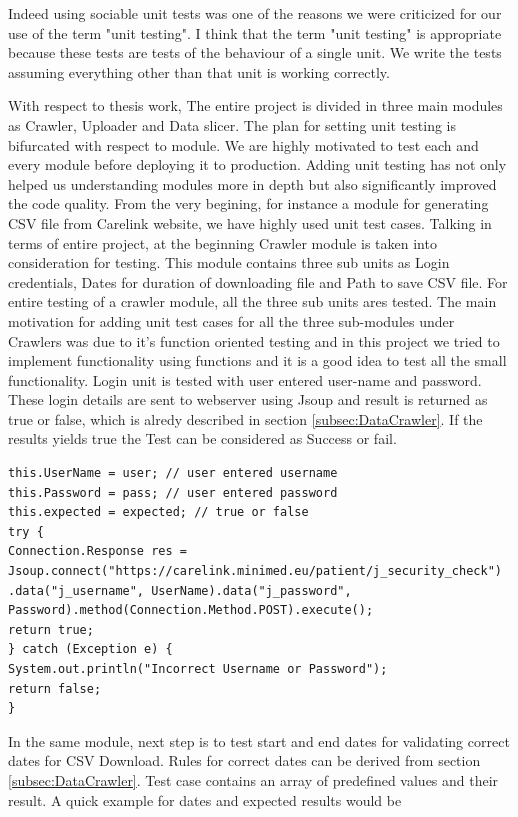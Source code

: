 \documentclass[article,type=msc,colorback,accentcolor=tud9c,twoside,11pt]{tudthesis}
\begin{document}
Indeed using sociable unit tests was one of the reasons we were criticized for our use of the term "unit testing". I think that the term "unit testing" is appropriate because these tests are tests of the behaviour of a single unit. We write the tests assuming everything other than that unit is working correctly.

With respect to thesis work, The entire project is divided in three main modules as Crawler, Uploader and Data slicer. The plan for setting unit testing is bifurcated with respect to module. We are highly motivated to test each and every module before deploying it to production. Adding unit testing has not only helped us understanding modules more in depth but also significantly improved the code quality. From the very begining, for instance a module for generating CSV file from Carelink website, we have highly used unit test cases. Talking in terms of entire project, at the beginning Crawler module is taken into consideration for testing. This module contains three sub units as Login credentials, Dates for duration of downloading file and Path to save CSV file. For entire testing of a crawler module, all the three sub units ares tested. The main motivation for adding unit test cases for all the three sub-modules under Crawlers was due to it's function oriented testing and in this project we tried to implement functionality using functions and it is a good idea to test all the small functionality. Login unit is tested with user entered user-name and password. These login details are sent to webserver using Jsoup and result is returned as true or false, which is alredy described in section \ref{subsec:DataCrawler}. If the results yields  true the Test can be considered as Success or fail.
\begin{lstlisting}
this.UserName = user; // user entered username
this.Password = pass; // user entered password
this.expected = expected; // true or false
try {
Connection.Response res = Jsoup.connect("https://carelink.minimed.eu/patient/j_security_check")
.data("j_username", UserName).data("j_password", Password).method(Connection.Method.POST).execute();
return true;
} catch (Exception e) {
System.out.println("Incorrect Username or Password");
return false;
}
\end{lstlisting}
 In the same module, next step is to test start and end dates for validating correct dates for CSV Download. Rules for correct dates can be derived from section \ref{subsec:DataCrawler}. Test case contains an array of predefined values and their result. A quick example for dates and expected results would be
\end{document}
